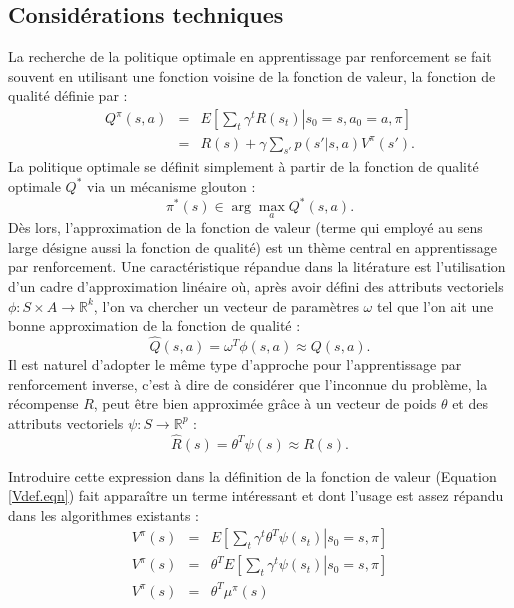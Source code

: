 \documentclass[publibook-draft]{CAp2012}
\begin{document}
\subsection{Considérations techniques}
\label{ConsiderationsTechniques.sec}
La recherche de la politique optimale en apprentissage par renforcement se fait souvent en utilisant une fonction voisine de la fonction de valeur, la fonction de qualité définie par :
\begin{eqnarray}
Q^\pi(s,a) &=& E\left[\left.\sum_t\gamma^tR(s_t)\right|s_0=s,a_0=a,\pi\right]\\
&=& R(s) + \gamma\sum_{s'}p(s'|s,a)V^\pi(s').
\end{eqnarray}
La politique optimale se définit simplement à partir de la fonction de qualité optimale $Q^*$ via un mécanisme glouton :
\begin{equation}
\label{greedy.eqn}
\pi^*(s) \in \arg\max_a Q^*(s,a).
\end{equation}
Dès lors, l'approximation de la fonction de valeur (terme qui employé au sens large désigne aussi la fonction de qualité) est un thème central en apprentissage par renforcement. Une caractéristique répandue dans la litérature est l'utilisation d'un cadre d'approximation linéaire où, après avoir défini des attributs vectoriels $\phi: S\times A \rightarrow \mathbb{R}^k$, l'on va chercher un vecteur de paramètres $\omega$ tel que l'on ait une bonne approximation de la fonction de qualité :
\begin{equation}
\hat Q (s,a) = \omega^T\phi(s,a)\approx Q(s,a).
\end{equation}
Il est naturel d'adopter le même type d'approche pour l'apprentissage par renforcement inverse, c'est à dire de considérer que l'inconnue du problème, la récompense $R$, peut être bien approximée grâce à un vecteur de poids $\theta$ et des attributs vectoriels $\psi : S\rightarrow \mathbb{R}^p$ :
\begin{equation}
\label{hatRdef.eqn}
\hat R(s) = \theta^T\psi(s)\approx R(s).
\end{equation}

Introduire cette expression dans la définition de la fonction de valeur (Equation \ref{Vdef.eqn}) fait apparaître un terme intéressant et dont l'usage est assez répandu dans les algorithmes existants :
\begin{eqnarray}
V^\pi(s) &=& E\left[\left.\sum_t\gamma^t\theta^T\psi(s_t)\right|s_0=s,\pi\right]\\
V^\pi(s) &=& \theta^TE\left[\left.\sum_t\gamma^t\psi(s_t)\right|s_0=s,\pi\right]\\
V^\pi(s) &=& \theta^T\mu^\pi(s)
\label{Vmu.eqn}
\end{eqnarray}
\end{document}
